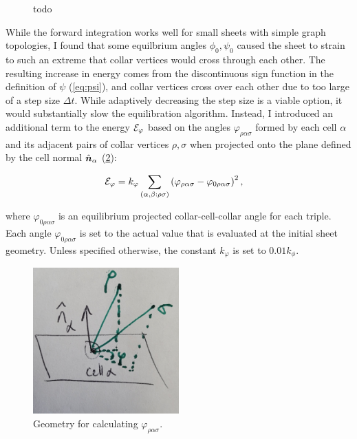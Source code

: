 
\begin{figure}
	\caption{todo}
	\label{fig:dynamics}
\end{figure}

While the forward integration works well for small sheets with simple graph topologies, I found that some equilbrium angles $\phi_0, \psi_0$ caused the sheet to strain to such an extreme that collar vertices would cross through each other. 
The resulting increase in energy comes from the discontinuous sign function in the definition of $\psi$ (\cref{eq:psi}), and collar vertices cross over each other due to too large of a step size $\Delta t$. 
While adaptively decreasing the step size is a viable option, it would substantially slow the equilibration algorithm.  
Instead, I introduced an additional term to the energy $\mathcal{E}_\varphi$ based on the angles $\varphi_{\rho\alpha\sigma}$ formed by each cell $\alpha$ and its adjacent pairs of collar vertices $\rho,\sigma$ when projected onto the plane defined by the cell normal $\hat{\bm{n}}_\alpha$ (\cref{fig:varphi}):

\begin{align}
	\mathcal{E}_\varphi &= k_\varphi \sum_{(\alpha,\beta:\rho\sigma)} \left(\varphi_{\rho\alpha\sigma} - \varphi_{0\rho\alpha\sigma} \right)^2, \label{eq:e_varphi}
\end{align}

\noindent where $\varphi_{0\rho\alpha\sigma}$ is an equilibrium projected collar-cell-collar angle for each triple. 
Each angle $\varphi_{0\rho\alpha\sigma}$ is set to the actual value that is evaluated at the initial sheet geometry.
Unless specified otherwise, the constant $k_\varphi$ is set to $0.01k_\phi$.

\begin{figure}
	\centering 
	\includegraphics[width=0.5\textwidth]{varphi.jpg}
	\caption{Geometry for calculating $\varphi_{\rho\alpha\sigma}$.}
	\label{fig:varphi}
\end{figure}

